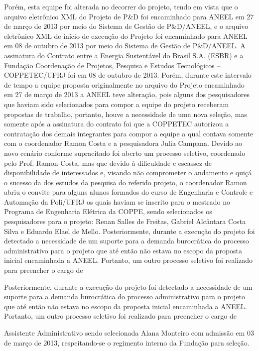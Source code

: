 Porém, esta equipe foi alterada no decorrer do projeto, tendo em vista que 
o arquivo eletrônico XML do Projeto de P\&D foi encaminhado para ANEEL em 27 de
março de 2013 por meio do Sistema de Gestão de P\&D/ANEEL, e o arquivo
eletrônico XML de início de execução do Projeto foi encaminhado para ANEEL em 08 de outubro de 2013 por meio do Sistema de Gestão de P\&D/ANEEL. A
assinatura do Contrato entre a Energia Sustentável do Brasil S.A. (ESBR) e a
Fundação Coordenação de Projetos, Pesquisa e Estudos Tecnológicos –
COPPETEC/UFRJ foi em 08 de outubro de 2013. Porém, durante este intervalo
de tempo a equipe proposta originalmente no arquivo do Projeto encaminhado em
27 de março de 2013 a ANEEL teve alteração, pois alguns dos pesquisadores que
haviam sido selecionados para compor a equipe do projeto receberam propostas
de trabalho, portanto, houve a necessidade de uma nova seleção, mas somente
após a assinatura do contrato foi que a COPPETEC autorizou a contratação dos
demais integrantes para compor a equipe a qual contava somente com o
coordenador Ramon Costa e a pesquisadora Julia Campana. Devido ao novo
cenário conforme supracitado foi aberto um processo seletivo, coordenado pelo
Prof. Ramon Costa, mas que devido à dificuldade e escassez de disponibilidade
de interessados e, visando não comprometer o andamento e quiçá o sucesso da
dos estudos da pesquisa do referido projeto, o coordenador Ramon abriu o convite
para alguns alunos formados do curso de Engenharia e Controle e Automação da
Poli/UFRJ os quais haviam se inscrito para o mestrado no Programa de
Engenharia Elétrica da COPPE, sendo selecionados os pesquisadores para o
projeto: Renan Salles de Freitas, Gabriel Alcântara Costa Silva e Eduardo Elael
de Mello.
Posteriormente, durante a execução do projeto foi detectado a necessidade de um
suporte para a demanda burocrática do processo administrativo para o projeto que
até então não estava no escopo da proposta inicial encaminhada a ANEEL.
Portanto, um outro processo seletivo foi realizado para preencher o cargo de

Posteriormente, durante a execução do projeto foi detectado a necessidade de um
suporte para a demanda burocrática do processo administrativo para o projeto que
até então não estava no escopo da proposta inicial encaminhada a ANEEL.
Portanto, um outro processo seletivo foi realizado para preencher o cargo de

Assistente Administrativo sendo selecionada Alana Monteiro com admissão em 03
de março de 2013, respeitando-se o regimento interno da Fundação para seleção.


